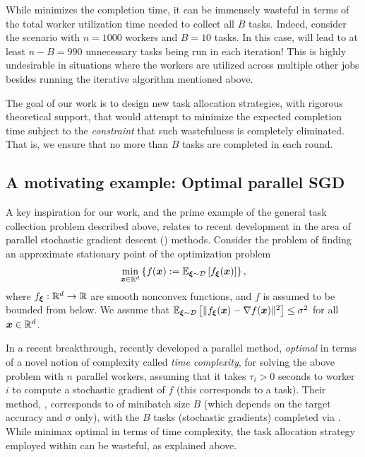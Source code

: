 
While  minimizes the completion time, it can be immensely wasteful in terms of the total worker utilization time needed to collect all $B$ tasks. Indeed, consider the scenario with $n=1000$ workers and $B=10$ tasks. In this case,  will lead to at least $n-B = 990$ unnecessary tasks being run in each iteration! This is highly undesirable in situations where the workers are utilized across multiple other jobs besides running the iterative algorithm mentioned above.


The goal of our work is to design new task allocation strategies, with rigorous theoretical support, that would attempt to minimize the expected completion time subject to the {\em constraint} that such wastefulness is completely eliminated. That is, we ensure that no more than $B$ tasks are completed in each round.

\subsection{A motivating example: Optimal parallel SGD}

A key inspiration for our work, and the prime example of the general task collection problem described above, relates to  recent development in the area of parallel stochastic gradient descent () methods.
Consider the problem of finding an approximate stationary point of the optimization problem
$$
    \min_{\bm{x} \in \mathbb{R}^d} \left\{f(\bm{x}) := {\mathbb{E}}_{\bm{\xi} \sim {\cal D}}\left[f_{\bm{\xi}}(\bm{x})\right]\right\},
$$
where $f_{\bm{\xi}}:\mathbb{R}^d\to \mathbb{R}$ are smooth nonconvex functions, and $f$ is assumed to be bounded from below. We assume that $\mathbb{E}_{\bm{\xi} \sim {\cal D}}\left[ \|f_{\bm{\xi}}(\bm{x}) - \nabla f(\bm{x})\|^2\right] \leq \sigma^2$ for all $\bm{x}\in \mathbb{R}^d$.

In a recent breakthrough, \citet{tyurin2024optimal} recently developed a parallel  method, {\em optimal} in terms of a novel notion of complexity called {\em time complexity}, for solving the above problem with $n$ parallel workers, assuming that  it takes $\tau_i>0$ seconds to worker $i$ to compute a stochastic gradient of $f$ (this corresponds to a task). Their method, , corresponds to  of minibatch size $B$ (which depends on the target accuracy and $\sigma$ only), with the $B$ tasks (stochastic gradients) completed via . While minimax optimal in terms of time complexity, the  task allocation strategy employed within  can be wasteful, as explained above.

